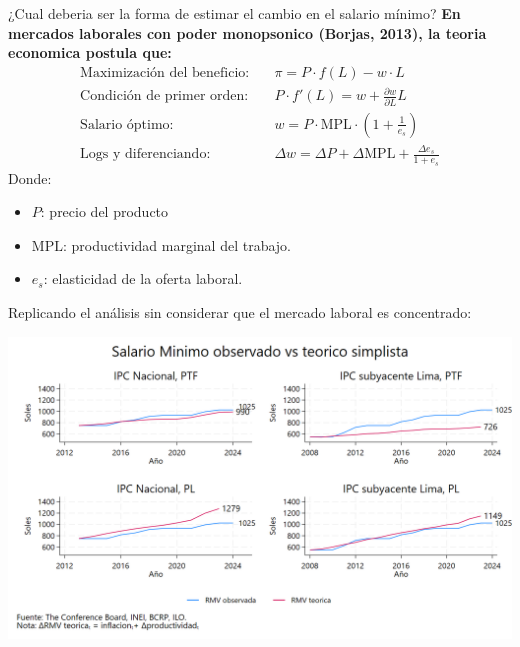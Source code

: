 \documentclass{beamer}
\begin{document}
\begin{frame}{¿Cual deberia ser la forma de estimar el cambio en el salario mínimo?}
    \textbf{En mercados laborales con poder monopsonico (Borjas, 2013), la teoria economica postula que:}
    \begin{align*}
        \text{Maximización del beneficio:} \quad & \pi = P \cdot f(L) - w \cdot L \\
        \text{Condición de primer orden:} \quad & P \cdot f'(L) = w + \frac{\partial w}{\partial L} L \\
        \text{Salario óptimo:} \quad & w = P \cdot \text{MPL} \cdot \left( 1 + \frac{1}{e_s} \right) \\
        \text{Logs y diferenciando:} \quad & \Delta w = \Delta P + \Delta \text{MPL} + \frac{\Delta {e_s}}{1+e_s}
    \end{align*}
    Donde:
    \begin{itemize}
        \item $P$: precio del producto
        \item $\text{MPL}$: productividad marginal del trabajo.
        \item $e_s$: elasticidad de la oferta laboral.
    \end{itemize}
\end{frame}

\begin{frame}{Replicando el análisis sin considerar que el mercado laboral es concentrado:}
    \begin{center}
        \includegraphics[width=\linewidth]{rmv_determination_sine.png}
    \end{center}
\end{frame}
\end{document}
